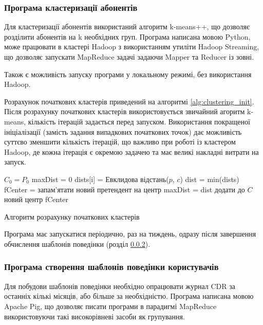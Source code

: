 \subsubsection{Програма кластеризації абонентів}

Для кластеризації абонентів використаний алгоритм k-means++, що дозволяє розділити абонентів на k необхідних груп. Програма написана мовою Python, може працювати в кластері Hadoop з використанням утиліти Hadoop Streaming, що дозволяє запускати MapReduce задачі задаючи Mapper та Reducer із зовні.

Також є можливість запуску програми у локальному режимі, без використання Hadoop.

Розрахунок початкових кластерів приведений на алгоритмі \ref{alg:clustering_init}. Після розрахунку початкових кластерів використовується звичайний агоритм k-means, кількість ітерацій задається перед запуском. Використання покращеної ініціалізації (замість задання випадкових початкових точок) дає можливість суттєво зменшити кількість ітерацій, що важливо при роботі із кластером Hadoop, де кожна ітерація є окремою задачею та має великі накладні витрати на запуск.

\begin{algorithm}[h]
   {
     {
      $C_{0} = P_{0}$\;
    }{
      maxDist = 0\;
       {
         {
          dists[i] = Евклидова відстань($p$, $c$)\;
        }
        dist = min(dists)\;
         {
          fCenter = запам'ятати новий претендент на центр\;
          maxDist = dist\;
        }
      }
      додати до $C$ новий центр fCenter\;
    }
  }
\caption{Алгоритм розрахунку початкових кластерів}
\label{alg:clustering_init}
\end{algorithm}

Програма має запускатися періодично, раз на тиждень, одразу після завершення обчислення шаблонів поведінки (розділ \ref{patterns_section}).

\subsubsection{Програма створення шаблонів поведінки користувачів}
\label{patterns_section}

Для побудови шаблонів поведінки необхідно опрацювати журнал CDR за останніх кількі місяців, або більше за необхідністю. Програма написана мовою Apache Pig, що дозволяє писати програми в парадигмі MapReduce використовуючи такі високорівневі засоби як групування.

